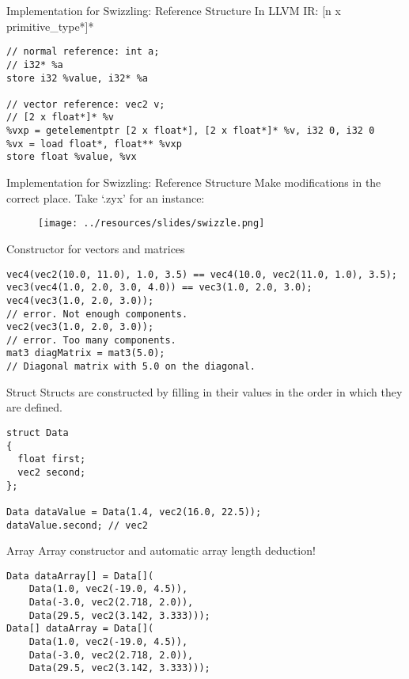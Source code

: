 \begin{frame}[fragile]{Implementation for Swizzling: Reference Structure}
    In LLVM IR: [n x primitive\_type*]*
    \begin{lstlisting}
// normal reference: int a;
// i32* %a
store i32 %value, i32* %a

// vector reference: vec2 v;
// [2 x float*]* %v
%vxp = getelementptr [2 x float*], [2 x float*]* %v, i32 0, i32 0
%vx = load float*, float** %vxp
store float %value, %vx
    \end{lstlisting}
\end{frame}

\begin{frame}{Implementation for Swizzling: Reference Structure}
    Make modifications in the correct place. Take `.zyx' for an instance:
    \begin{figure}
        \texttt{[image: ../resources/slides/swizzle.png]}
    \end{figure}
\end{frame}

\begin{frame}[fragile]{Constructor for vectors and matrices}
    \begin{lstlisting}
vec4(vec2(10.0, 11.0), 1.0, 3.5) == vec4(10.0, vec2(11.0, 1.0), 3.5);
vec3(vec4(1.0, 2.0, 3.0, 4.0)) == vec3(1.0, 2.0, 3.0);
vec4(vec3(1.0, 2.0, 3.0)); 
// error. Not enough components.
vec2(vec3(1.0, 2.0, 3.0)); 
// error. Too many components.
mat3 diagMatrix = mat3(5.0);
// Diagonal matrix with 5.0 on the diagonal.
    \end{lstlisting}
\end{frame}

\begin{frame}[fragile]{Struct}
    Structs are constructed by filling in their values 
    in the order in which they are defined.
    \begin{lstlisting}
struct Data
{
  float first;
  vec2 second;
};

Data dataValue = Data(1.4, vec2(16.0, 22.5));
dataValue.second; // vec2    
    \end{lstlisting}
\end{frame}

\begin{frame}[fragile]{Array}
    Array constructor and automatic array length deduction!
    \begin{lstlisting}
Data dataArray[] = Data[](
    Data(1.0, vec2(-19.0, 4.5)),
    Data(-3.0, vec2(2.718, 2.0)),
    Data(29.5, vec2(3.142, 3.333)));
Data[] dataArray = Data[](
    Data(1.0, vec2(-19.0, 4.5)),
    Data(-3.0, vec2(2.718, 2.0)),
    Data(29.5, vec2(3.142, 3.333))); 
    \end{lstlisting}
\end{frame}